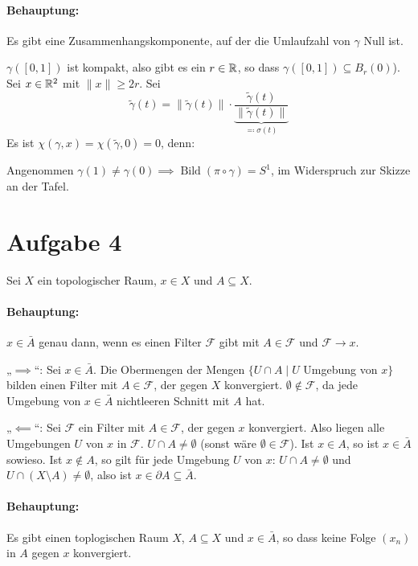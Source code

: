 \documentclass{article}
\begin{document}
\paragraph{Behauptung:} Es gibt eine Zusammenhangskomponente, auf der die Umlaufzahl von $\gamma$ Null ist.

$\gamma([0,1])$ ist kompakt, also gibt es ein $r\in \mathbb{R}$, so dass $\gamma([0,1])\subseteq B_r(0)$). Sei $x\in \mathbb{R}^2$ mit $\|x\|\ge 2r$. Sei
\[
\tilde\gamma(t) = \|\tilde\gamma(t)\| \cdot \underbrace{\frac{\tilde\gamma(t)}{\|\tilde\gamma(t)\|}}_{\eqqcolon \sigma(t)}
\]
Es ist $\chi(\gamma,x)=\chi(\tilde\gamma,0)=0$, denn:

Angenommen $\gamma(1) \ne \gamma(0) \implies \operatorname{Bild}(\pi\circ \gamma)=S^1$, im Widerspruch zur Skizze an der Tafel.

\section*{Aufgabe 4}

Sei $X$ ein topologischer Raum, $x\in X$ und $A\subseteq X$.

\paragraph{Behauptung:} $x\in\bar A$ genau dann, wenn es einen Filter $\mathcal F$ gibt mit $A\in \mathcal F$ und $\mathcal F \to x$.

„$\implies$“: Sei $x\in \bar A$. Die Obermengen der Mengen $\{U\cap A \mid U$ Umgebung von $x\}$ bilden einen Filter mit $A\in \mathcal F$, der gegen $X$ konvergiert. $\emptyset\notin\mathcal F$, da jede Umgebung von $x\in \bar A$ nichtleeren Schnitt mit $A$ hat.

„$\impliedby$“: Sei $\mathcal F$ ein Filter mit $A\in \mathcal F$, der gegen $x$ konvergiert. Also liegen alle Umgebungen  $U$ von $x$ in $\mathcal F$. $U\cap A\ne \emptyset$ (sonst wäre $\emptyset\in \mathcal F$). Ist $x\in A$, so ist $x\in \bar A$ sowieso. Ist $x\notin A$, so gilt für jede Umgebung $U$ von $x$: $U\cap A\ne \emptyset$ und $U\cap (X\setminus A)\ne \emptyset$, also ist $x\in \partial A\subseteq \bar A$.

\paragraph{Behauptung:} Es gibt einen toplogischen Raum $X$, $A\subseteq X$ und $x\in \bar A$, so dass keine Folge $(x_n)$ in $A$ gegen $x$ konvergiert.
\end{document}
